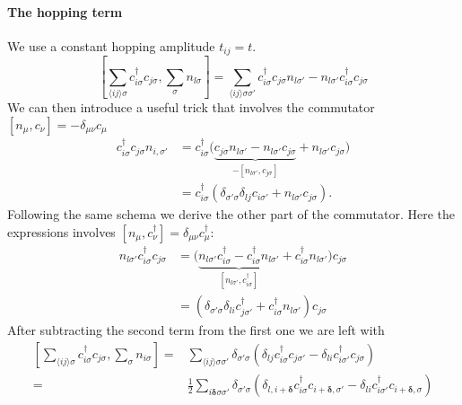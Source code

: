 \documentclass[../main.tex]{subfile}
\begin{document}
\paragraph{The hopping term} $~$\\
 We use a constant hopping amplitude $t_{ij} = t$.
\[
    \left[ \sum_{\langle ij\rangle\sigma} c_{i\sigma}^{\dagger}c_{j\sigma} , \sum_{\sigma} n_{l\sigma}\right] 
    = \sum_{\langle ij\rangle\sigma\sigma'}  c_{i\sigma}^{\dagger}c_{j\sigma}n_{l\sigma'} - n_{l\sigma'}c_{i\sigma}^{\dagger}c_{j\sigma}
\]
We can then introduce a useful trick that involves the commutator $[n_{\mu},c_{\nu}] = -\delta_{\mu\nu}c_{\mu}$
\begin{equation*}
    \begin{aligned}
    c_{i\sigma}^{\dagger}c_{j\sigma}n_{i,\sigma'} &= c_{i\sigma}^{\dagger} \bigl( \underbrace{c_{j\sigma}n_{l\sigma'} 
    -n_{l\sigma'}c_{j\sigma}}_{-[n_{l\sigma'},c_{j\sigma}]} + n_{l\sigma'}c_{j\sigma}\bigr) \\
    & = c_{i\sigma}^{\dagger} \left(\delta_{\sigma'\sigma}\delta_{lj}c_{i\sigma'} + n_{l\sigma'}c_{j\sigma}\right).
    \end{aligned}
\end{equation*}
Following the same schema we derive the other part of the commutator. Here the expressions involves
$[n_{\mu}, c^{\dagger}_{\nu}] = \delta_{\mu\nu}c^{\dagger}_{\mu}$:
\begin{equation*}
    \begin{aligned}
        n_{l\sigma'}c_{i\sigma}^{\dagger}c_{j\sigma} &= \bigl( \underbrace{n_{l\sigma'}c_{i\sigma}^{\dagger} 
        - c_{i\sigma}^{\dagger}n_{l\sigma'}}_{[n_{l\sigma'}, c^{\dagger}_{i\sigma}]} + c_{i\sigma}^{\dagger}n_{l\sigma'} \bigr)c_{j\sigma} \\
        &= \left(\delta_{\sigma'\sigma}\delta_{li}c_{j\sigma'}^{\dagger} + c_{i\sigma}^{\dagger}n_{l\sigma'} \right)c_{j\sigma}
    \end{aligned}
\end{equation*}
After subtracting the second term from the first one we are left with
\begin{equation*}
    \begin{aligned}
    \left[ \sum_{\langle ij\rangle\sigma} c_{i\sigma}^{\dagger}c_{j\sigma} , \sum_{\sigma} n_{i\sigma}\right] 
    =&\sum_{\langle ij\rangle\sigma\sigma'} \delta_{\sigma'\sigma} \left( \delta_{lj}c_{i\sigma}^{\dagger} c_{j\sigma'} - \delta_{li}c_{i\sigma'}^{\dagger}c_{j\sigma}\right)\\
    =& \frac{1}{2}\sum_{ i \bm{\delta}\sigma\sigma'} \delta_{\sigma'\sigma} \left( \delta_{l,i+ \bm{\delta}}c_{i\sigma}^{\dagger} c_{i+ \bm{\delta},\sigma'} - \delta_{li}c_{i\sigma'}^{\dagger}c_{i+ \bm{\delta},\sigma}\right)
\end{aligned}
\end{equation*}
\end{document}
